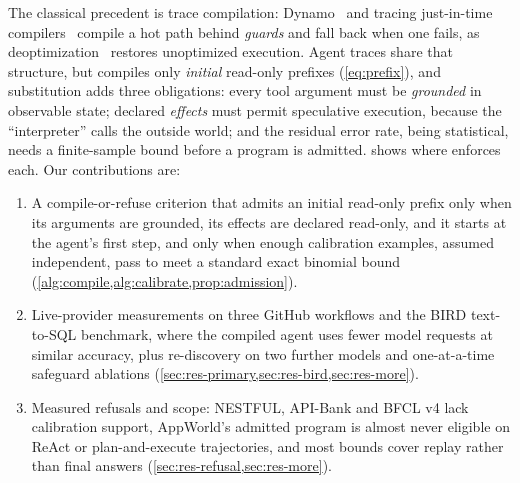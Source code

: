 The classical precedent is trace compilation: Dynamo~\citep{bala2000dynamo}
and tracing just-in-time compilers~\citep{gal2009tracejit} compile a hot path
behind \emph{guards} and fall back when one fails, as
deoptimization~\citep{holzle1992deopt} restores unoptimized execution. Agent
traces share that structure, but \method compiles only \emph{initial}
read\nobreakdash-only prefixes (\cref{eq:prefix}), and substitution adds three
obligations: every tool argument must be \emph{grounded} in observable state;
declared \emph{effects} must permit speculative execution, because the
``interpreter'' calls the outside world; and the residual error rate, being
statistical, needs a finite-sample bound before a program is admitted.
 shows where \method enforces each. Our contributions are:

\begin{enumerate}[leftmargin=1.2em,itemsep=1pt,topsep=2pt]
  \item A compile-or-refuse criterion that admits an initial read-only prefix
only when its arguments are grounded, its effects are declared read-only, and
it starts at the agent's first step, and only when enough calibration
examples, assumed independent, pass to meet a standard exact binomial bound
(\cref{alg:compile,alg:calibrate,prop:admission}).
  \item Live-provider measurements on three GitHub workflows and the BIRD
text-to-SQL benchmark, where the compiled agent uses fewer model requests at
similar accuracy, plus re-discovery on two further models and
one-at-a-time safeguard ablations (\cref{sec:res-primary,sec:res-bird,sec:res-more}).
  \item Measured refusals and scope: NESTFUL, API-Bank and BFCL v4 lack
calibration support, AppWorld's admitted program is almost never eligible on
ReAct or plan-and-execute trajectories, and most bounds cover replay rather
than final answers (\cref{sec:res-refusal,sec:res-more}).
\end{enumerate}
